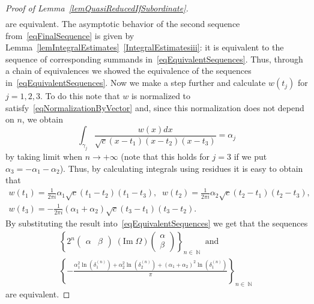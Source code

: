 \documentclass{amsart}
\numberwithin{equation}{section}
\theoremstyle{definition}
\theoremstyle{remark}
\DeclareMathOperator{\NN}{\mathbb N}
\begin{document}
\begin{proof}[Proof of Lemma~\ref{lemQuasiReducedIfSubordinate}]
\begin{multline}
		\end{multline}
		are equivalent. The asymptotic behavior of the second sequence from~\eqref{eqFinalSequence} is given by Lemma~\ref{lemIntegralEstimates}~\ref{IntegralEstimatesiii}: it is equivalent to the sequence of corresponding summands in~\eqref{eqEquivalentSequences}. Thus, through a chain of equivalences we showed the equivalence of the sequences in~\eqref{eqEquivalentSequences}. Now we make a step further and calculate $w(t_j)$ for $j = 1,2,3$. To do this note that $w$ is normalized to satisfy~\eqref{eqNormalizationByVector} and, since this normalization does not depend on $n$, we obtain
		\[
		\int_{\gamma_j}\frac{w(x)dx}{\sqrt{c}(x - t_1)(x - t_2)(x - t_3)} = \alpha_j
		\]
		by taking limit when $n \to +\infty$ (note that this holds for $j = 3$ if we put $\alpha_3 = -\alpha_1 - \alpha_2$). Thus, by calculating integrals using residues it is easy to obtain that 
		\[
		\begin{gathered}
			w(t_1) = \frac{1}{2\pi i} \alpha_1\sqrt{c}(t_1 - t_2)(t_1 - t_3),\;\; w(t_2) = \frac{1}{2\pi i} \alpha_2\sqrt{c}(t_2 - t_1)(t_2 - t_3),\\
			w(t_3) = -\frac{1}{2\pi i} (\alpha_1 + \alpha_2)\sqrt{c}(t_3 - t_1)(t_3 - t_2).
		\end{gathered}
		\]
		By substituting the result into~\eqref{eqEquivalentSequences} we get that the sequences
		\begin{multline}\label{eqEquivalentSequencesFinal}
			\left\{2^n\begin{pmatrix}
				\alpha & \beta
			\end{pmatrix} \;(\mathrm{Im}\;\Omega) \begin{pmatrix}
				\alpha \\ \beta
			\end{pmatrix}\right\}_{n \in \NN} \text{ and }\\
			\left\{ -\frac{\alpha_1^2 \ln\left(\delta_1^{(n)}\right) + \alpha_2^2 \ln\left(\delta_2^{(n)}\right) +(\alpha_1 + \alpha_2)^2 \ln\left(\delta_1^{(n)}\right)}{\pi}   \right\}_{n \in \NN}
		\end{multline}
		are equivalent.
		

\end{proof}
\end{document}
